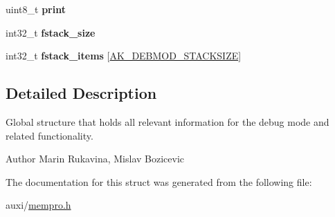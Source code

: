 \begin{DoxyCompactItemize}
\item 
\mbox{\label{structAK__debmod__state_aac493bdfb4f6bdd89162f8e03b3e24cd}} 
uint8\+\_\+t {\bfseries print}
\item 
\mbox{\label{structAK__debmod__state_ae158d16ad071a384fcc3f2dca119cb46}} 
int32\+\_\+t {\bfseries fstack\+\_\+size}
\item 
\mbox{\label{structAK__debmod__state_a54855b79d1d20af29a8050b6c66319cd}} 
int32\+\_\+t {\bfseries fstack\+\_\+items} \mbox{[}\hyperlink{mempro_8h_a8628cfbef864832e90cffe391a583494}{A\+K\+\_\+\+D\+E\+B\+M\+O\+D\+\_\+\+S\+T\+A\+C\+K\+S\+I\+ZE}\mbox{]}
\end{DoxyCompactItemize}


\subsection{Detailed Description}
Global structure that holds all relevant information for the debug mode and related functionality. 

\begin{DoxyAuthor}{Author}
Marin Rukavina, Mislav Bozicevic 
\end{DoxyAuthor}


The documentation for this struct was generated from the following file\+:\begin{DoxyCompactItemize}
\item 
auxi/\hyperlink{mempro_8h}{mempro.\+h}\end{DoxyCompactItemize}
